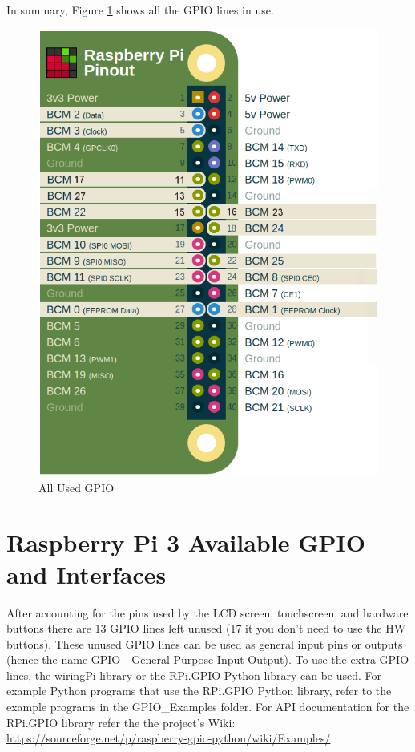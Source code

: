 \documentclass{article}
\begin{document}
In summary, Figure \ref{All_Used_GPIO} shows all the GPIO lines in use.


	\begin{figure}[H]
		\centering
		\includegraphics[scale=0.3]{pics/All_Used_GPIO.png}
		\caption{All Used GPIO}
		\label{All_Used_GPIO}
	\end{figure}

\section{Raspberry Pi 3 Available GPIO and Interfaces}

After accounting for the pins used by the LCD screen, touchscreen, and hardware buttons there are 13 GPIO lines left unused (17 it you don't need to use the HW buttons). These unused GPIO lines can be used as general input pins or outputs (hence the name GPIO - General Purpose Input Output). To use the extra GPIO lines, the wiringPi library or the RPi.GPIO Python library can be used. For example Python programs that use the RPi.GPIO Python library, refer to the example programs in the GPIO\_Examples folder. For API documentation for the RPi.GPIO library refer the the project's Wiki: \href{https://sourceforge.net/p/raspberry-gpio-python/wiki/Examples/}{https://sourceforge.net/p/raspberry-gpio-python/wiki/Examples/} \\
\end{document}
